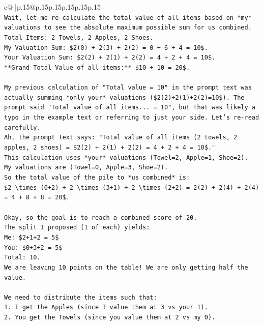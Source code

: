 \documentclass{article}
\begin{document}
{\begin{supertabular}{c@{$\;$}|p{.15\linewidth}@{}p{.15\linewidth}p{.15\linewidth}p{.15\linewidth}p{.15\linewidth}p{.15\linewidth}}
{{{\\ 
\texttt{Wait, let me re{-}calculate the total value of all items based on *my* valuations to see the absolute maximum possible sum for us combined.} \\
\texttt{Total Items: 2 Towels, 2 Apples, 2 Shoes.} \\
\texttt{My Valuation Sum: \$2(0) + 2(3) + 2(2) = 0 + 6 + 4 = 10\$.} \\
\texttt{Your Valuation Sum: \$2(2) + 2(1) + 2(2) = 4 + 2 + 4 = 10\$.} \\
\texttt{**Grand Total Value of all items:** \$10 + 10 = 20\$.} \\
\\ 
\texttt{My previous calculation of "Total value = 10" in the prompt text was actually summing *only your* valuations (\$2(2)+2(1)+2(2)=10\$). The prompt said "Total value of all items... = 10", but that was likely a typo in the example text or referring to just your side. Let's re{-}read carefully.} \\
\texttt{Ah, the prompt text says: "Total value of all items (2 towels, 2 apples, 2 shoes) = \$2(2) + 2(1) + 2(2) = 4 + 2 + 4 = 10\$."} \\
\texttt{This calculation uses *your* valuations (Towel=2, Apple=1, Shoe=2).} \\
\texttt{My valuations are (Towel=0, Apple=3, Shoe=2).} \\
\texttt{So the total value of the pile to *us combined* is:} \\
\texttt{\$2 \textbackslash{}times (0+2) + 2 \textbackslash{}times (3+1) + 2 \textbackslash{}times (2+2) = 2(2) + 2(4) + 2(4) = 4 + 8 + 8 = 20\$.} \\
\\ 
\texttt{Okay, so the goal is to reach a combined score of 20.} \\
\texttt{The split I proposed (1 of each) yields:} \\
\texttt{Me: \$2+1+2 = 5\$} \\
\texttt{You: \$0+3+2 = 5\$} \\
\texttt{Total: 10.} \\
\texttt{We are leaving 10 points on the table! We are only getting half the value.} \\
\\ 
\texttt{We need to distribute the items such that:} \\
\texttt{1.  I get the Apples (since I value them at 3 vs your 1).} \\
\texttt{2.  You get the Towels (since you value them at 2 vs my 0).} \\
}}}
\end{supertabular}}
\end{document}
